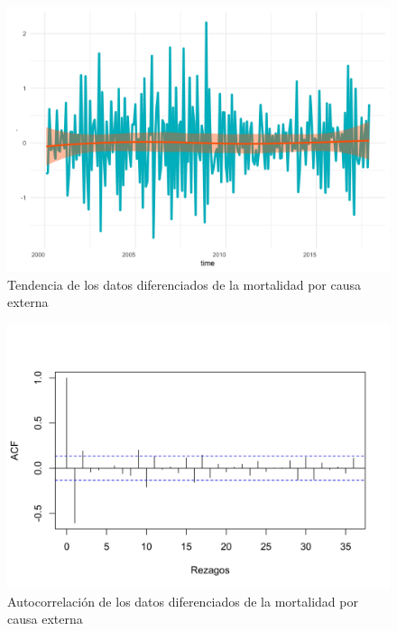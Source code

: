 \documentclass[
]{article}
\begin{document}
\begin{figure}[H]
\includegraphics[width=1\linewidth,height=1\textheight]{Tesis_files/figure-latex/externa_comportamiento-1} \caption{Tendencia de los datos diferenciados de la mortalidad por causa externa}\label{fig:externa_comportamiento}
\end{figure}

\begin{figure}[H]
\includegraphics[width=1\linewidth,height=1\textheight]{Tesis_files/figure-latex/externa_acf-1} \caption{Autocorrelación de los datos diferenciados de la mortalidad por causa externa}\label{fig:externa_acf}
\end{figure}
\end{document}
